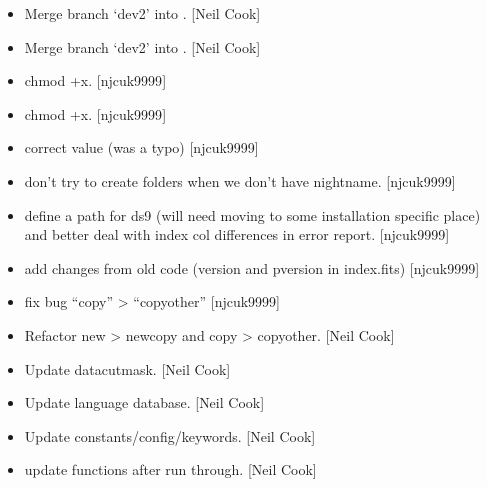 \documentclass[a4paper,10pt,english]{report}
\begin{document}
\begin{itemize}
\item {} 
Merge branch ‘dev2’ into . {[}Neil Cook{]}

\item {} 
Merge branch ‘dev2’ into . {[}Neil Cook{]}

\item {} 
 \sphinxhyphen{} chmod +x. {[}njcuk9999{]}

\item {} 
 \sphinxhyphen{} chmod +x. {[}njcuk9999{]}

\item {} 
 \sphinxhyphen{} correct 
value (was a typo) {[}njcuk9999{]}

\item {} 
 \sphinxhyphen{} don’t try to create folders when we don’t have
nightname. {[}njcuk9999{]}

\item {} 
 \sphinxhyphen{} define a path for ds9 (will need moving to some
installation specific place) and better deal with index col
differences in error report. {[}njcuk9999{]}

\item {} 
 \sphinxhyphen{} add changes from old code (version
and pversion in index.fits) {[}njcuk9999{]}

\item {} 
 \sphinxhyphen{} fix bug “copy” \textendash{}\textgreater{} “copyother” {[}njcuk9999{]}

\item {} 
Refactor new \textendash{}\textgreater{} newcopy   and copy \textendash{}\textgreater{} copyother. {[}Neil Cook{]}

\item {} 
Update datacutmask. {[}Neil Cook{]}

\item {} 
Update language database. {[}Neil Cook{]}

\item {} 
Update constants/config/keywords. {[}Neil Cook{]}

\item {} 
 \sphinxhyphen{} update functions after run through. {[}Neil Cook{]}


\end{itemize}
\end{document}
